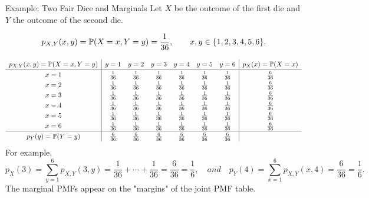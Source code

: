 \begin{frame}{Example: Two Fair Dice and Marginals}
Let $X$ be the outcome of the first die and $Y$ the outcome of the second die.

\[
p_{X,Y}(x,y)=\mathbb{P}(X=x,Y=y)=\frac1{36},
\qquad x,y\in\{1,2,3,4,5,6\}.
\]

\[
\renewcommand{\arraystretch}{1.25}
\begin{array}{c|cccccc|c}
p_{X,Y}(x,y) =\Prob(X=x, Y=y)& y=1 & y=2 & y=3 & y=4 & y=5 & y=6 & p_X(x)=\Prob(X=x)\\
\hline
x=1 & \frac1{36} & \frac1{36} & \frac1{36} & \frac1{36} & \frac1{36} & \frac1{36} & \frac6{36}\\
x=2 & \frac1{36} & \frac1{36} & \frac1{36} & \frac1{36} & \frac1{36} & \frac1{36} & \frac6{36}\\
x=3 & \frac1{36} & \frac1{36} & \frac1{36} & \frac1{36} & \frac1{36} & \frac1{36} & \frac6{36}\\
x=4 & \frac1{36} & \frac1{36} & \frac1{36} & \frac1{36} & \frac1{36} & \frac1{36} & \frac6{36}\\
x=5 & \frac1{36} & \frac1{36} & \frac1{36} & \frac1{36} & \frac1{36} & \frac1{36} & \frac6{36}\\
x=6 & \frac1{36} & \frac1{36} & \frac1{36} & \frac1{36} & \frac1{36} & \frac1{36} & \frac6{36}\\
\hline
p_Y(y)=\Prob(Y=y) & \frac6{36} & \frac6{36} & \frac6{36} & \frac6{36} & \frac6{36} & \frac6{36} &
\end{array}
\]
For example,
\[
p_X(3)=\sum_{y=1}^6 p_{X,Y}(3,y)
=
\frac1{36}+\cdots+\frac1{36}
=
\frac6{36}
=
\frac16, \quad and\quad p_Y(4)=\sum_{x=1}^6 p_{X,Y}(x,4)
=
\frac6{36}
=
\frac16.
\]
The marginal PMFs appear on the "margins" of the joint PMF table.
\end{frame}














